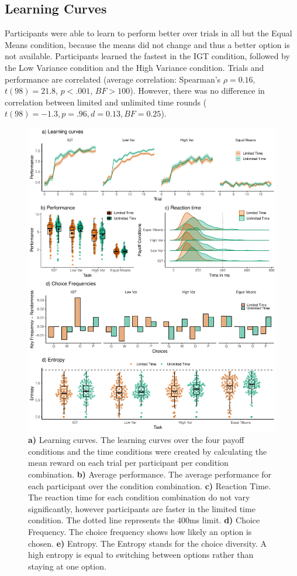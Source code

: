 \subsection{Learning Curves}
Participants were able to learn to perform better over trials in all but the Equal Means condition, because the means did not change and thus a better option is not available. Participants learned the fastest in the IGT condition, followed by the Low Variance condition and the High Variance condition. Trials and performance are correlated (average correlation: Spearman's $\rho =  0.16$, $t(98)=21.8$, $p< .001$, $BF > 100$). 
However, there was no difference in correlation between limited and unlimited time rounds ($t(98)=-1.3, p=.96, d=0.13, BF=0.25$).
\begin{figure}
    \centering
    \includegraphics[width=1\textwidth]{Plots/Behaviorplots.pdf}
    \caption[Behavior Analysis Plots]{\textbf{a)} Learning curves. The learning curves over the four payoff conditions and the time conditions were created by calculating the mean reward on each trial per participant per condition combination. \textbf{b)} Average performance. The average performance for each participant over the condition combination. \textbf{c)} Reaction Time. The reaction time for each condition combination do not vary significantly, however participants are faster in the limited time condition. The dotted line represents the 400ms limit. \textbf{d)} Choice Frequency. The choice frequency shows how likely an option is chosen. \textbf{e)} Entropy. The Entropy stands for the choice diversity. A high entropy is equal to switching between options rather than staying at one option. }
    \label{fig:BehaviorPlots}
\end{figure}
